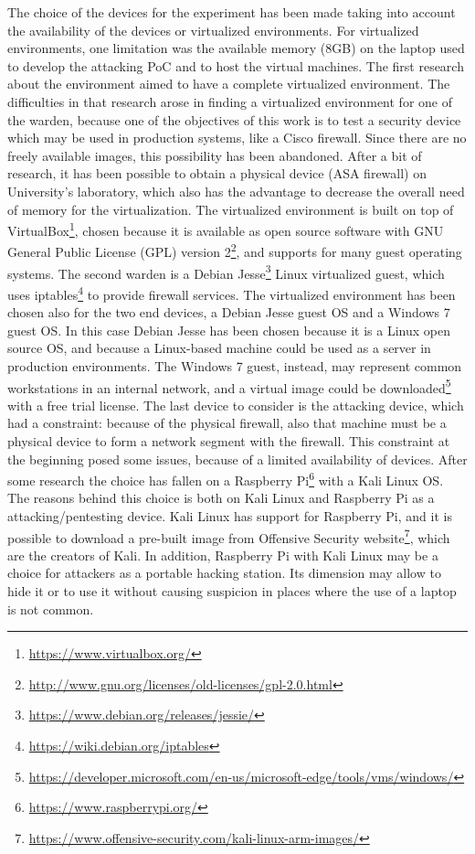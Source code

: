 \documentclass[12pt]{article}
\begin{document}
The choice of the devices for the experiment has been made taking into account the availability of the devices or virtualized environments. For virtualized environments, one limitation was the available memory (8GB) on the laptop used to develop the attacking PoC and to host the virtual machines. The first research about the environment aimed to have a complete virtualized environment. The difficulties in that research arose in finding a virtualized environment for one of the warden, because one of the objectives of this work is to test a security device which may be used in production systems, like a Cisco firewall. Since there are no freely available images, this possibility has been abandoned. After a bit of research, it has been possible to obtain a physical device (ASA firewall) on University's laboratory, which also has the advantage to decrease the overall need of memory for the virtualization. The virtualized environment is built on top of VirtualBox\footnote{\url{https://www.virtualbox.org/}}, chosen because it is available as open source software with GNU General Public License (GPL) version 2\footnote{\url{http://www.gnu.org/licenses/old-licenses/gpl-2.0.html}}, and supports for many guest operating systems. The second warden is a Debian Jesse\footnote{\url{https://www.debian.org/releases/jessie/}} Linux virtualized guest, which uses iptables\footnote{\url{https://wiki.debian.org/iptables}} to provide firewall services. The virtualized environment has been chosen also for the two end devices, a Debian Jesse guest OS and a Windows 7 guest OS. In this case Debian Jesse has been chosen because it is a Linux open source OS, and because a Linux-based machine could be used as a server in production environments. The Windows 7 guest, instead, may represent common workstations in an internal network, and a virtual image could be downloaded\footnote{\url{https://developer.microsoft.com/en-us/microsoft-edge/tools/vms/windows/}} with a free trial license. The last device to consider is the attacking device, which had a constraint: because of the physical firewall, also that machine must be a physical device to form a network segment with the firewall. This constraint at the beginning posed some issues, because of a limited availability of devices. After some research the choice has fallen on a Raspberry Pi\footnote{\url{https://www.raspberrypi.org/}} with a Kali Linux OS. The reasons behind this choice is both on Kali Linux and Raspberry Pi as a attacking/pentesting device. Kali Linux has support for Raspberry Pi, and it is possible to download a pre-built image from Offensive Security website\footnote{\url{https://www.offensive-security.com/kali-linux-arm-images/}}, which are the creators of Kali. In addition, Raspberry Pi with Kali Linux may be a choice for attackers as a portable hacking station. Its dimension may allow to hide it or to use it without causing suspicion in places where the use of a laptop is not common.
\end{document}
